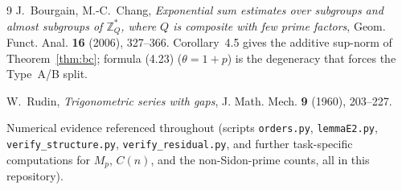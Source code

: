 \documentclass[11pt]{article}
\theoremstyle{plain}
\theoremstyle{definition}
\theoremstyle{remark}
\newcommand{\Z}{\mathbb{Z}}
\begin{document}
\begin{thebibliography}{9}
J.~Bourgain, M.-C.~Chang, \emph{Exponential sum estimates over subgroups and
almost subgroups of $\Z_Q^*$, where $Q$ is composite with few prime factors},
Geom. Funct. Anal. \textbf{16} (2006), 327--366. Corollary~4.5 gives the additive
sup-norm of Theorem~\ref{thm:bc}; formula (4.23) ($\theta=1+p$) is the degeneracy
that forces the Type~A/B split.

W.~Rudin, \emph{Trigonometric series with gaps}, J. Math. Mech. \textbf{9}
(1960), 203--227.

Numerical evidence referenced throughout (scripts \texttt{orders.py},
\texttt{lemmaE2.py}, \texttt{verify\_structure.py}, \texttt{verify\_residual.py},
and further task-specific computations for $M_p$, $C(n)$, and the
non-Sidon-prime counts, all in this repository).

\end{thebibliography}
\end{document}

